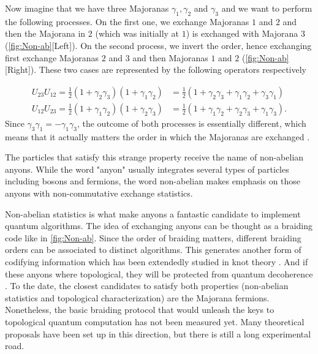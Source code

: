 Now imagine that we have three Majoranas $\gamma_1, \gamma_2$ and $\gamma_3$ and we want to perform the following processes. On the first one, we exchange Majoranas $1$ and $2$ and then the Majorana in $2$ (which was initially at $1$) is exchanged with Majorana $3$ (\ref{fig:Non-ab}[Left]). On the second process, we invert the order, hence exchanging first exchange Majoranas $2$ and $3$ and then Majoranas $1$ and $2$ (\ref{fig:Non-ab}[Right]). These two cases are represented by the following operators respectively 

\begin{equation}
  \begin{aligned}
   U_{23}U_{12} = \frac{1}{2}\left( 1 + \gamma_2 \gamma_3 \right)\left( 1 + \gamma_1 \gamma_2 \right) &= \frac{1}{2}\left( 1 + \gamma_2 \gamma_3 + \gamma_1 \gamma_2 + \gamma_3 \gamma_1\right)
    \\
   U_{12}U_{23} = \frac{1}{2}\left( 1 + \gamma_1 \gamma_2 \right)\left( 1 + \gamma_2 \gamma_3 \right) &= \frac{1}{2}\left( 1 + \gamma_1 \gamma_2 +\gamma_2 \gamma_3 + \gamma_1 \gamma_3\right).
  \end{aligned}
\end{equation}
\noindent Since $\gamma_3 \gamma_1 = -\gamma_1 \gamma_3$, the outcome of both processes is essentially different, which means that it actually matters the order in which the Majoranas are exchanged .

 The particles that satisfy this strange property receive the name of non-abelian anyons. While the word "anyon" usually integrates several types of particles  including bosons and fermions, the word non-abelian makes emphasis on those anyons with non-commutative exchange statistics. 

 Non-abelian statistics is what make anyons a fantastic candidate to implement quantum algorithms. The idea of exchanging anyons can be thought as a braiding code like in \ref{fig:Non-ab}. Since the order of braiding matters, different braiding orders  can be associated to distinct algorithms. This generates another form of codifying information  which has been extendedly studied in knot theory \cite{turaev_book}. And if these anyons where topological, they will be protected from quantum decoherence \cite{nayak_non-abelian_2008}. To the date, the closest candidates to satisfy both properties (non-abelian statistics and topological characterization) are the Majorana fermions. Nonetheless, the basic braiding protocol that would unleash the keys to topological quantum computation \cite{pachos_introduction_2012} has not been measured yet. Many theoretical proposals have been set up in this direction, but there is still a long experimental road. 





